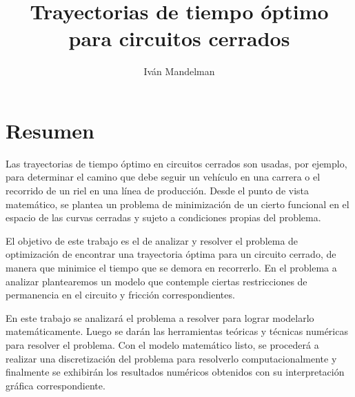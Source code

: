 \documentclass[a4paper,10pt]{book}
\title{Trayectorias de tiempo óptimo \\para circuitos cerrados}
\author{Iván Mandelman}
\newcounter{ejem}[section]
\begin{document}
\maketitle

\section*{Resumen}
    Las trayectorias de tiempo óptimo en circuitos cerrados son usadas, por ejemplo, para determinar el camino que debe seguir un vehículo en una carrera o el recorrido de un riel en una línea de producción. Desde el punto de vista matemático, se plantea un problema de minimización de un cierto funcional en el espacio de las curvas cerradas y sujeto a condiciones propias del problema.
    
    El objetivo de este trabajo es el de analizar y resolver el problema de optimización de encontrar una trayectoria óptima para un circuito cerrado, de manera que minimice el tiempo que se demora en recorrerlo. En el problema a analizar plantearemos un modelo que contemple ciertas restricciones de permanencia en el circuito y fricción correspondientes.
    
    En este trabajo se analizará el problema a resolver para lograr modelarlo matemáticamente. Luego se darán las herramientas teóricas y técnicas numéricas para resolver el problema. Con el modelo matemático listo, se procederá a realizar una discretización del problema para resolverlo computacionalmente y finalmente se exhibirán los resultados numéricos obtenidos con su interpretación gráfica correspondiente.

\tableofcontents

\pagebreak
\end{document}
